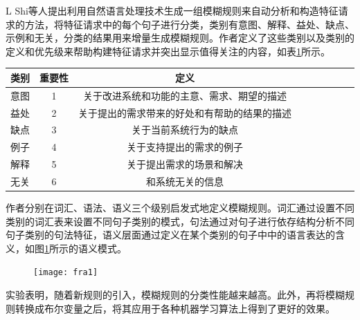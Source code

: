 L Shi等人\cite{shi2017understanding}提出利用自然语言处理技术生成一组模糊规则来自动分析和构造特征请求的方法，将特征请求中的每个句子进行分类，类别有意图、解释、益处、缺点、示例和无关，分类的结果用来增量生成模糊规则。作者定义了这些类别以及类别的定义和优先级来帮助构建特征请求并突出显示值得关注的内容，如表\ref{tab:fra0}所示。
\begin{table}[htbp]
    \label{tab:fra0}
    \centering
    \footnotesize%
    \setlength{\tabcolsep}{4pt}%
    \renewcommand{\arraystretch}{1.2}%
\begin{tabular}{lcccccccc}
\hline
类别 & 重要性 & 定义                     \\
\hline
意图 & 1   & 关于改进系统和功能的主意、需求、期望的描述  \\
益处 & 2   & 关于提出的需求带来的好处和有帮助的结果的描述 \\
缺点 & 3   & 关于当前系统行为的缺点            \\
例子 & 4   & 关于支持提出的需求的例子           \\
解释 & 5   & 关于提出需求的场景和解决           \\
无关 & 6   & 和系统无关的信息              \\
\hline
\end{tabular}
\end{table}
作者分别在词汇、语法、语义三个级别启发式地定义模糊规则。词汇通过设置不同类别的词汇表来设置不同句子类别的模式，句法通过对句子进行依存结构分析不同句子类别的句法特征，语义层面通过定义在某个类别的句子中中的语言表达的含义，如图\ref{fig:fra1}所示的语义模式。
\begin{figure}[htbp]
    \centering
    \texttt{[image: fra1]}
    \label{fig:fra1}
\end{figure}
实验表明，随着新规则的引入，模糊规则的分类性能越来越高。此外，再将模糊规则转换成布尔变量之后，将其应用于各种机器学习算法上得到了更好的效果。


